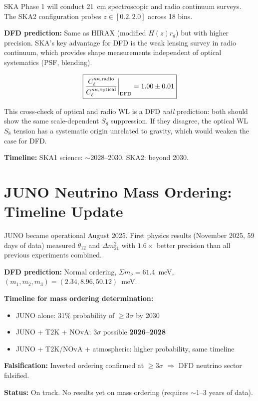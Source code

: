 \documentclass[11pt,a4paper]{article}
\begin{document}
\begin{newbox}

SKA Phase 1 will conduct 21~cm spectroscopic and radio continuum surveys.
The SKA2 configuration probes $z \in [0.2, 2.0]$ across 18 bins.

\textbf{DFD prediction:} Same as HIRAX (modified $H(z) r_d$) but with
higher precision. SKA's key advantage for DFD is the weak lensing survey
in radio continuum, which provides shape measurements independent of
optical systematics (PSF, blending).

\begin{equation}
\boxed{
\frac{C_\ell^{\kappa\kappa,\rm radio}}{C_\ell^{\kappa\kappa,\rm optical}}
\bigg|_{\rm DFD} = 1.00 \pm 0.01
}
\end{equation}

This cross-check of optical and radio WL is a DFD \emph{null} prediction:
both should show the same scale-dependent $S_8$ suppression. If they
disagree, the optical WL $S_8$ tension has a systematic origin unrelated
to gravity, which would weaken the case for DFD.

\textbf{Timeline:} SKA1 science: $\sim$2028--2030. SKA2: beyond 2030.
\end{newbox}

\section{JUNO Neutrino Mass Ordering: Timeline Update}
\label{sec:juno}

\begin{predbox}

JUNO became operational August 2025. First physics results (November 2025,
59 days of data) measured $\theta_{12}$ and $\Delta m^2_{21}$ with
$1.6\times$ better precision than all previous experiments combined.

\textbf{DFD prediction:} Normal ordering, $\Sigma m_\nu = 61.4$~meV,
$(m_1, m_2, m_3) = (2.34, 8.96, 50.12)$~meV.

\textbf{Timeline for mass ordering determination:}
\begin{itemize}[nosep]
\item JUNO alone: 31\% probability of $\geq 3\sigma$ by 2030
\item JUNO + T2K + NOvA: $3\sigma$ possible \textbf{2026--2028}
\item JUNO + T2K/NOvA + atmospheric: higher probability, same timeline
\end{itemize}

\textbf{Falsification:} Inverted ordering confirmed at $\geq 3\sigma$
$\Rightarrow$ DFD neutrino sector falsified.

\textbf{Status:} On track. No results yet on mass ordering (requires
$\sim$1--3 years of data).
\end{predbox}
\end{document}
